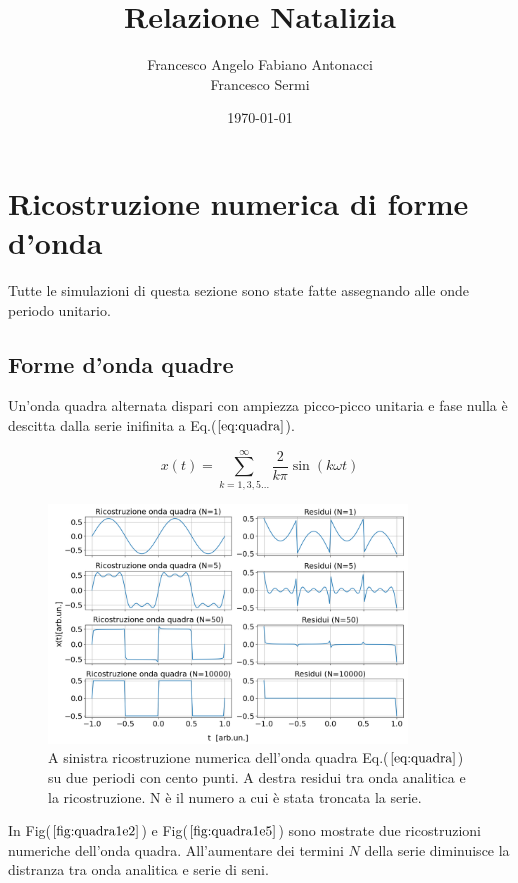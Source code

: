 \documentclass{article}
\author{Francesco Angelo Fabiano Antonacci\\Francesco Sermi}
\date{\today}
\title{Relazione Natalizia}
\begin{document}
\maketitle

\section{Ricostruzione numerica di forme d'onda}
    Tutte le simulazioni di questa sezione sono state fatte assegnando alle onde 
    periodo unitario.
    \subsection{Forme d'onda quadre}
    \label{sez:quadra}
        Un'onda quadra alternata dispari con ampiezza picco-picco unitaria e fase 
        nulla è descitta dalla serie inifinita a Eq.($\ref{eq:quadra}$).

        \begin{equation}
            x(t) = \sum_{k=1,3,5...}^{\infty} \frac{2}{k\pi}\sin\left(k\omega t\right)
            \label{eq:quadra}
        \end{equation}


        \begin{figure}[htbp]
            \centering
            \includegraphics[width=0.85\textwidth]{fousquarewave1e2.png} %
            \caption{A sinistra ricostruzione numerica dell'onda quadra Eq.($\ref{eq:quadra}$) su
                    due periodi con cento punti.
                    A destra residui tra onda analitica e la ricostruzione.
                    N è il numero a cui è stata troncata la serie.}
            \label{fig:quadra1e2}
        \end{figure}

        \noindent In Fig($\ref{fig:quadra1e2}$) e Fig($\ref{fig:quadra1e5}$) sono mostrate due ricostruzioni
        numeriche dell'onda quadra.
        All'aumentare dei termini $N$ della serie diminuisce la distranza tra onda analitica e serie 
        di seni.
\end{document}
